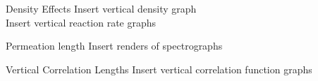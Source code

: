\documentclass{beamer}
\begin{document}
    \begin{frame}[t]{Density Effects}
        Insert vertical density graph\\
        Insert vertical reaction rate graphs
    \end{frame}

    \begin{frame}[t]{Permeation length}
        Insert renders of spectrographs
    \end{frame}

    \begin{frame}[t]{Vertical Correlation Lengths}
        Insert vertical correlation function graphs
    \end{frame}
\end{document}
